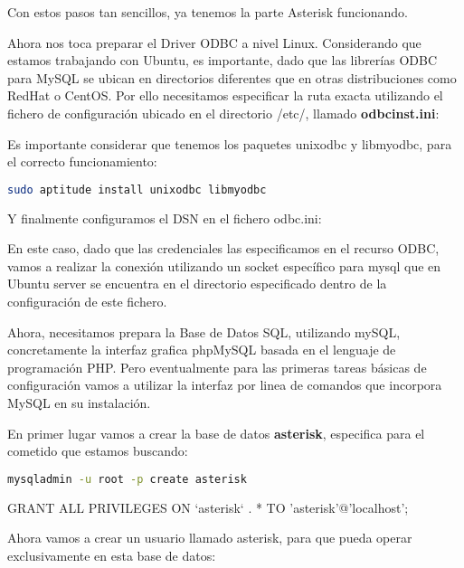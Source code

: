 {

Con estos pasos tan sencillos, ya tenemos la parte Asterisk funcionando.

Ahora nos toca preparar el Driver ODBC a nivel Linux. Considerando que estamos trabajando con Ubuntu, es importante, dado que las librerías ODBC para MySQL se ubican en directorios diferentes que en otras distribuciones como RedHat o CentOS. Por ello necesitamos especificar la ruta exacta utilizando el fichero de configuración ubicado en el directorio /etc/, llamado \textbf{odbcinst.ini}:



Es importante considerar que tenemos los paquetes unixodbc y libmyodbc, para el correcto funcionamiento:

\begin{lstlisting}[language=sh]
sudo aptitude install unixodbc libmyodbc
\end{lstlisting}

Y finalmente configuramos el DSN en el fichero odbc.ini:



En este caso, dado que las credenciales las especificamos en el recurso ODBC, vamos a realizar la conexión utilizando un socket específico para mysql que en Ubuntu server se encuentra en el directorio especificado dentro de la configuración de este fichero.

Ahora, necesitamos prepara la Base de Datos SQL, utilizando mySQL, concretamente la interfaz grafica phpMySQL basada en el lenguaje de programación PHP. Pero eventualmente para las primeras tareas básicas de configuración vamos a utilizar la interfaz por linea de comandos que incorpora MySQL en su instalación.

En primer lugar vamos a crear la base de datos \textbf{asterisk}, especifica para el cometido que estamos buscando:

\begin{lstlisting}[language=sh]
mysqladmin -u root -p create asterisk
\end{lstlisting}

GRANT ALL PRIVILEGES ON `asterisk` . * TO 'asterisk'@'localhost';


Ahora vamos a crear un usuario llamado asterisk, para que pueda operar exclusivamente en esta base de datos:



}
